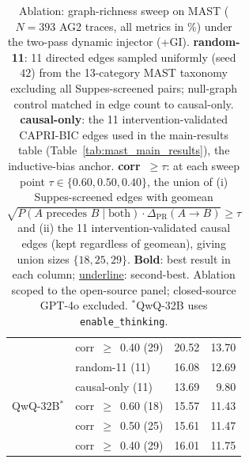 \begin{table}[t]
\begin{tabular}{l l rr}
  & corr~$\geq$~0.40 (29) & 20.52              & 13.70              \\[3pt]
\multirow{5}{*}{QwQ-32B$^{*}$}
  & random-11        (11) & 16.08              & 12.69              \\
  & causal-only      (11) & 13.69              &  9.80              \\
  & corr~$\geq$~0.60 (18) & 15.57              & 11.43              \\
  & corr~$\geq$~0.50 (25) & 15.61              & 11.47              \\
  & corr~$\geq$~0.40 (29) & 16.01              & 11.75              \\
\bottomrule
\end{tabular}
\caption{%
  Ablation: graph-richness sweep on MAST ($N{=}393$ AG2 traces, all
  metrics in \%) under the two-pass dynamic injector (+GI).
  \textbf{random-11}: 11 directed edges sampled uniformly (seed $42$)
  from the 13-category MAST taxonomy excluding all Suppes-screened
  pairs; null-graph control matched in edge count to causal-only.
  \textbf{causal-only}: the 11 intervention-validated CAPRI-BIC edges
  used in the main-results table (Table~\ref{tab:mast_main_results}),
  the inductive-bias anchor.
  \textbf{corr~${\geq}\tau$}: at each sweep point
  $\tau\in\{0.60,0.50,0.40\}$, the union of (i) Suppes-screened edges
  with geomean
  $\sqrt{P(A\text{ precedes }B\mid\text{both})\cdot\Delta_{\mathrm{PR}}(A\!\to\!B)}\geq\tau$
  and (ii) the 11 intervention-validated causal edges (kept regardless
  of geomean), giving union sizes $\{18,25,29\}$.
  \textbf{Bold}: best result in each column;
  \underline{underline}: second-best.
  Ablation scoped to the open-source panel; closed-source GPT-4o
  excluded. $^{*}$QwQ-32B uses \texttt{enable\_thinking}.%
}
\label{tab:mast_ablation_threshold_sweep}
\end{table}
